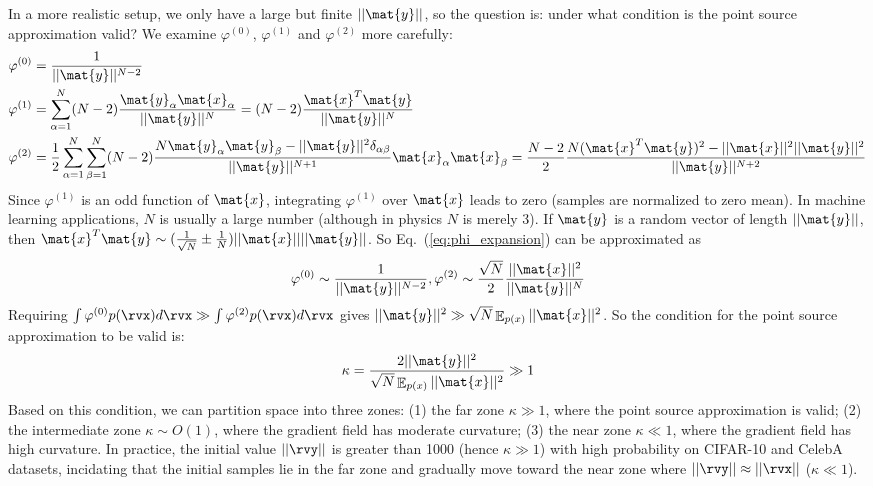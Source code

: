 In a more realistic setup, we only have a large but finite $||\mat{y}||$, so the question is: under what condition is the point source approximation valid? We examine $\varphi^{(0)}$, $\varphi^{(1)}$ and $\varphi^{(2)}$ more carefully:
\begin{equation}\label{eq:phi_expansion}
\begin{aligned}
    &\varphi^{(0)} = \frac{1}{||\mat{y}||^{N-2}} \\
    &\varphi^{(1)} = \sum_{\alpha=1}^N (N-2)\frac{\mat{y}_\alpha\mat{x}_\alpha}{||\mat{y}||^N}=(N-2)\frac{\mat{x}^T\mat{y}}{||\mat{y}||^N}\\
    &\varphi^{(2)}=\frac{1}{2}\sum_{\alpha=1}^N\sum_{\beta=1}^N (N-2)\frac{N\mat{y}_\alpha\mat{y}_\beta-||\mat{y}||^2\delta_{\alpha\beta}}{||\mat{y}||^{N+1}}\mat{x}_\alpha\mat{x}_\beta=\frac{N-2}{2}\frac{N(\mat{x}^T\mat{y})^2-||\mat{x}||^2||\mat{y}||^2}{||\mat{y}||^{N+2}}
\end{aligned}
\end{equation}
Since $\varphi^{(1)}$ is an odd function of $\mat{x}$, integrating $\varphi^{(1)}$ over $\mat{x}$ leads to zero (samples are normalized to zero mean). In machine learning applications, $N$ is usually a large number (although in physics $N$ is merely 3). If $\mat{y}$ is a random vector of length $||\mat{y}||$, then $\mat{x}^T\mat{y}\sim (\frac{1}{\sqrt{N}}\pm\frac{1}{N})||\mat{x}||||\mat{y}||$. So Eq.~(\ref{eq:phi_expansion}) can be approximated as 
\begin{equation}
    \varphi^{(0)}\sim \frac{1}{||\mat{y}||^{N-2}}, \varphi^{(2)}\sim \frac{{\sqrt{N}}}{2}\frac{||\mat{x}||^2}{||\mat{y}||^N}
\end{equation}
Requiring $\int \varphi^{(0)} p(\rvx) d\rvx \gg \int \varphi^{(2)} p(\rvx) d \rvx$ gives $||\mat{y}||^2\gg \sqrt{N}\mathop{\mathbb{E}}_{p(x)}||\mat{x}||^2$. So the condition for the point source approximation to be valid is:
\begin{equation}
    \kappa=\frac{2||\mat{y}||^2}{\sqrt{N}\mathop{\mathbb{E}}_{p(x)}||\mat{x}||^2}\gg 1 
\end{equation}
Based on this condition, we can partition space into three zones: (1) the far zone $\kappa\gg1$, where the point source approximation is valid; (2) the intermediate zone $\kappa\sim O(1)$, where the gradient field has moderate curvature; (3) the near zone $\kappa\ll 1$, where the gradient field has high curvature. In practice, the initial value $||\rvy||$ is greater than 1000 (hence $\kappa \gg 1$) with high probability on CIFAR-10 and CelebA datasets, incidating that the initial samples lie in the far zone and gradually move toward the near zone where $||\rvy|| \approx ||\rvx||$ ($\kappa \ll 1$).

